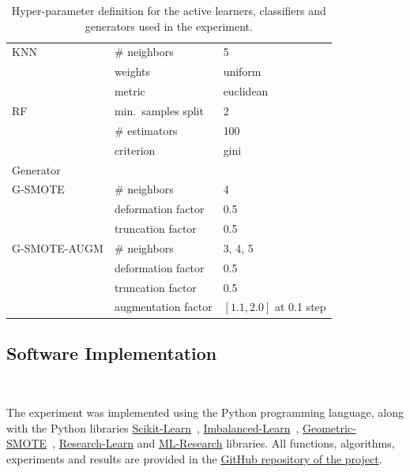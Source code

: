 \documentclass[parskip=full]{scrartcl}
\begin{document}
\begin{table}[H]
\begin{tabular}{lll}
		KNN             & \# neighbors                     & 5                              \\
                        & weights                          & uniform                        \\
                        & metric                           & euclidean                      \\
		RF              & min.\ samples split              & 2                              \\
		                & \# estimators                    & 100                            \\
                        & criterion                        & gini                           \\
		\toprule
		Generator       &                                  &                                \\
		\midrule
		G-SMOTE         & \# neighbors                     & 4                              \\
                        & deformation factor               & 0.5                            \\
                        & truncation factor                & 0.5                            \\
		G-SMOTE-AUGM    & \# neighbors                     & 3, 4, 5                        \\
                        & deformation factor               & 0.5                            \\
                        & truncation factor                & 0.5                            \\
                        & augmentation factor              & $[1.1, 2.0]$ at 0.1 step       \\
		\bottomrule
	\end{tabular}
    \caption{\label{tab:grid}
        Hyper-parameter definition for the active learners, classifiers and
        generators used in the experiment.
    }
\end{table}

\subsection{Software Implementation}~\label{sec:software_implementation}

The experiment was implemented using the Python programming language, along
with the Python libraries
\href{https://scikit-learn.org/stable/}{Scikit-Learn}~\cite{Pedregosa2011},
\href{https://imbalanced-learn.org/en/stable/}{Imbalanced-Learn}~\cite{JMLR:v18:16-365},
\href{https://geometric-smote.readthedocs.io/en/latest/?badge=latest}{Geometric-SMOTE}~\cite{Douzas2019},
\href{https://research-learn.readthedocs.io/en/latest/?badge=latest}{Research-Learn}
and
\href{https://mlresearch.readthedocs.io/en/latest/?badge=latest}{ML-Research}
libraries. All functions, algorithms, experiments and results are provided in
the \href{https://github.com/joaopfonseca/ml-research/}{GitHub repository of
the project}.
\end{document}
